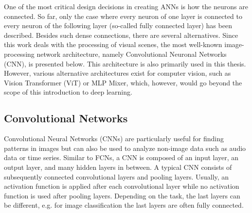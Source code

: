 One of the most critical design decisions in creating ANNs is how the neurons are connected.
So far, only the case where every neuron of one layer is connected to every neuron of the following layer (so-called fully connected layer) has been described. 
Besides such dense connections, there are several alternatives.
Since this work deals with the processing of visual scenes, the most well-known image-processing network architecture, namely Convolutional Neuronal Networks (CNN), is presented below. This architecture is also primarily used in this thesis. However, various alternative architectures exist for computer vision, such as Vision Transformer (ViT) or MLP Mixer, which, however, would go beyond the scope of this introduction to deep learning.























\subsection{Convolutional Networks}
Convolutional Neural Networks (CNNs) are particularly useful for finding patterns in images but can also be used to analyze non-image data such as audio data or time series.
Similar to FCNs, a CNN is composed of an input layer, an output layer, and many hidden layers in between.
A typical CNN consists of subsequently connected convolutional layers and pooling layers.
Usually, an activation function is applied after each convolutional layer while no activation function is used after pooling layers.
Depending on the task, the last layers can be different, e.g. for image classification the last layers are often fully connected.

